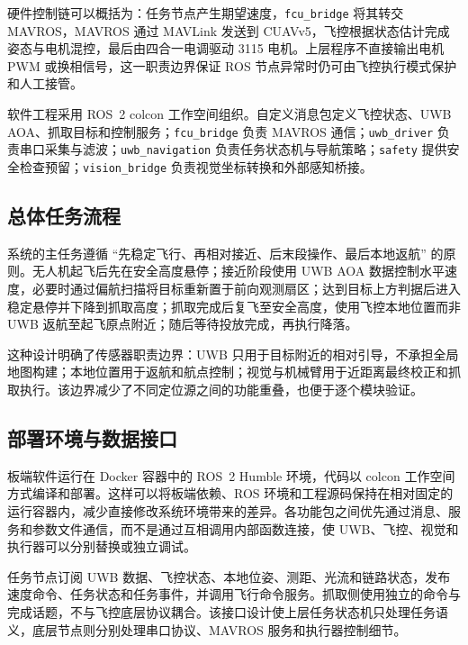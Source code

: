 \documentclass[12pt,a4paper]{ctexart}
\begin{document}
硬件控制链可以概括为：任务节点产生期望速度，\texttt{fcu\_bridge} 将其转交 MAVROS，MAVROS 通过 MAVLink 发送到 CUAVv5，飞控根据状态估计完成姿态与电机混控，最后由四合一电调驱动 3115 电机。上层程序不直接输出电机 PWM 或换相信号，这一职责边界保证 ROS 节点异常时仍可由飞控执行模式保护和人工接管。

软件工程采用 ROS~2 colcon 工作空间组织。自定义消息包定义飞控状态、UWB AOA、抓取目标和控制服务；\texttt{fcu\_bridge} 负责 MAVROS 通信；\texttt{uwb\_driver} 负责串口采集与滤波；\texttt{uwb\_navigation} 负责任务状态机与导航策略；\texttt{safety} 提供安全检查预留；\texttt{vision\_bridge} 负责视觉坐标转换和外部感知桥接。

\subsection{总体任务流程}
系统的主任务遵循 ``先稳定飞行、再相对接近、后末段操作、最后本地返航'' 的原则。无人机起飞后先在安全高度悬停；接近阶段使用 UWB AOA 数据控制水平速度，必要时通过偏航扫描将目标重新置于前向观测扇区；达到目标上方判据后进入稳定悬停并下降到抓取高度；抓取完成后复飞至安全高度，使用飞控本地位置而非 UWB 返航至起飞原点附近；随后等待投放完成，再执行降落。

这种设计明确了传感器职责边界：UWB 只用于目标附近的相对引导，不承担全局地图构建；本地位置用于返航和航点控制；视觉与机械臂用于近距离最终校正和抓取执行。该边界减少了不同定位源之间的功能重叠，也便于逐个模块验证。

\subsection{部署环境与数据接口}
板端软件运行在 Docker 容器中的 ROS~2 Humble 环境，代码以 colcon 工作空间方式编译和部署。这样可以将板端依赖、ROS 环境和工程源码保持在相对固定的运行容器内，减少直接修改系统环境带来的差异。各功能包之间优先通过消息、服务和参数文件通信，而不是通过互相调用内部函数连接，使 UWB、飞控、视觉和执行器可以分别替换或独立调试。

任务节点订阅 UWB 数据、飞控状态、本地位姿、测距、光流和链路状态，发布速度命令、任务状态和任务事件，并调用飞行命令服务。抓取侧使用独立的命令与完成话题，不与飞控底层协议耦合。该接口设计使上层任务状态机只处理任务语义，底层节点则分别处理串口协议、MAVROS 服务和执行器控制细节。

\begin{center}
\end{center}
\end{document}
